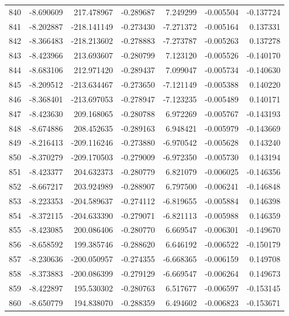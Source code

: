 \begin{tabular}{rrrrrrr}
 840 &  -8.690609 &  217.478967 & -0.289687 &   7.249299 &  -0.005504 & -0.137724 \\
 841 &  -8.202887 & -218.141149 & -0.273430 &  -7.271372 &  -0.005164 &  0.137331 \\
 842 &  -8.366483 & -218.213602 & -0.278883 &  -7.273787 &  -0.005263 &  0.137278 \\
 843 &  -8.423966 &  213.693607 & -0.280799 &   7.123120 &  -0.005526 & -0.140170 \\
 844 &  -8.683106 &  212.971420 & -0.289437 &   7.099047 &  -0.005734 & -0.140630 \\
 845 &  -8.209512 & -213.634467 & -0.273650 &  -7.121149 &  -0.005388 &  0.140220 \\
 846 &  -8.368401 & -213.697053 & -0.278947 &  -7.123235 &  -0.005489 &  0.140171 \\
 847 &  -8.423630 &  209.168065 & -0.280788 &   6.972269 &  -0.005767 & -0.143193 \\
 848 &  -8.674886 &  208.452635 & -0.289163 &   6.948421 &  -0.005979 & -0.143669 \\
 849 &  -8.216413 & -209.116246 & -0.273880 &  -6.970542 &  -0.005628 &  0.143240 \\
 850 &  -8.370279 & -209.170503 & -0.279009 &  -6.972350 &  -0.005730 &  0.143194 \\
 851 &  -8.423377 &  204.632373 & -0.280779 &   6.821079 &  -0.006025 & -0.146356 \\
 852 &  -8.667217 &  203.924989 & -0.288907 &   6.797500 &  -0.006241 & -0.146848 \\
 853 &  -8.223353 & -204.589637 & -0.274112 &  -6.819655 &  -0.005884 &  0.146398 \\
 854 &  -8.372115 & -204.633390 & -0.279071 &  -6.821113 &  -0.005988 &  0.146359 \\
 855 &  -8.423085 &  200.086406 & -0.280770 &   6.669547 &  -0.006301 & -0.149670 \\
 856 &  -8.658592 &  199.385746 & -0.288620 &   6.646192 &  -0.006522 & -0.150179 \\
 857 &  -8.230636 & -200.050957 & -0.274355 &  -6.668365 &  -0.006159 &  0.149708 \\
 858 &  -8.373883 & -200.086399 & -0.279129 &  -6.669547 &  -0.006264 &  0.149673 \\
 859 &  -8.422897 &  195.530302 & -0.280763 &   6.517677 &  -0.006597 & -0.153145 \\
 860 &  -8.650779 &  194.838070 & -0.288359 &   6.494602 &  -0.006823 & -0.153671 \\

\end{tabular}
